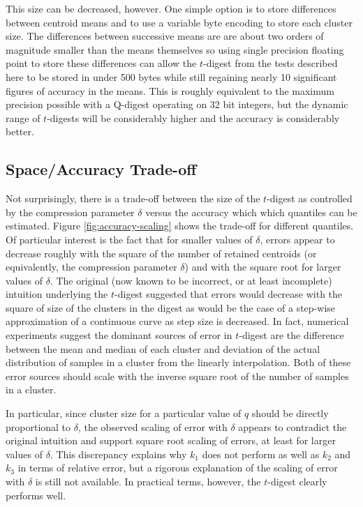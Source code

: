\documentclass[]{statsoc}
\begin{document}
This size can be decreased, however.  One simple option is to store differences between centroid means and to use a variable byte encoding to store each cluster size.  The differences between successive means are are about two orders of magnitude smaller than the means themselves so using single precision floating point to store these differences can allow the $t$-digest from the tests described here to be stored in under 500 bytes while still regaining nearly 10 significant figures of accuracy in the means.  This is roughly equivalent to the maximum precision possible with a Q-digest operating on 32 bit integers, but the dynamic range of $t$-digests will be considerably higher and the accuracy is considerably better.

\subsection{Space/Accuracy Trade-off}
Not surprisingly, there is a trade-off between the size of the $t$-digest as controlled by the compression parameter $\delta$ versus the accuracy which which quantiles can be estimated.  Figure \ref{fig:accuracy-scaling} shows the trade-off for different quantiles. Of particular interest is the fact that for smaller values of $\delta$, errors appear to decrease roughly with the  square of the number of retained centroids (or equivalently, the compression parameter $\delta$) and with the square root for larger values of $\delta$. The original (now known to be incorrect, or at least incomplete) intuition underlying the $t$-digest suggested that errors would decrease with the square of size of the clusters in the digest as would be the case of a step-wise approximation of a continuous curve as step size is decreased. In fact, numerical experiments suggest the dominant sources of error in $t$-digest are the difference between the mean and median of each cluster and deviation of the actual distribution of samples in a cluster from the linearly interpolation. Both of these error sources should scale with the inverse square root of the number of samples in a cluster.

In particular, since cluster size for a particular value of $q$ should be directly proportional to $\delta$,  the observed scaling of error with $\delta$ appears to contradict the original intuition and support square root scaling of errors, at least for larger values of $\delta$. This discrepancy explains why $k_1$ does not perform as well as $k_2$ and $k_3$ in terms of relative error, but a rigorous explanation of the scaling of error with $\delta$ is still not available. In practical terms, however, the $t$-digest clearly performs well.
\end{document}
